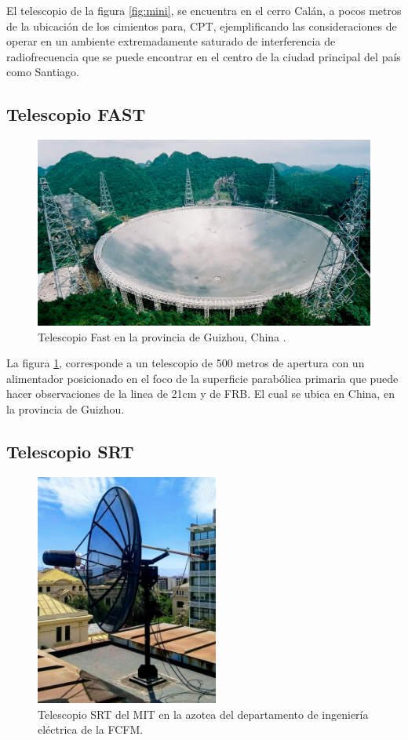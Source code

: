 El telescopio de la figura \ref{fig:mini}, se encuentra en el cerro Calán, a pocos metros de la ubicación de los cimientos para, CPT, ejemplificando las consideraciones de operar en un ambiente extremadamente saturado de interferencia de radiofrecuencia que se puede encontrar en el centro de la ciudad principal del país como Santiago.

\subsection{Telescopio FAST}

\begin{figure}
    \centering
    \includegraphics[width = 12cm]{img/fast.png}
    \caption{Telescopio Fast en la provincia de Guizhou, China \cite{FAST2024}.}
    \label{fig:fast}
\end{figure}

La figura \ref{fig:fast}, corresponde a un telescopio de 500 metros de apertura con un alimentador posicionado en el foco de la superficie parabólica primaria que puede hacer observaciones de la linea de 21cm y de FRB. El cual se ubica en China, en la provincia de Guizhou.

\subsection{Telescopio SRT}

\begin{figure}
    \centering
    \includegraphics[width = 6cm]{img/srt.png}
    \caption{Telescopio SRT del MIT en la azotea del departamento de ingeniería eléctrica de la FCFM\cite{Curotto2019}.}
    \label{fig:srt}
\end{figure}

